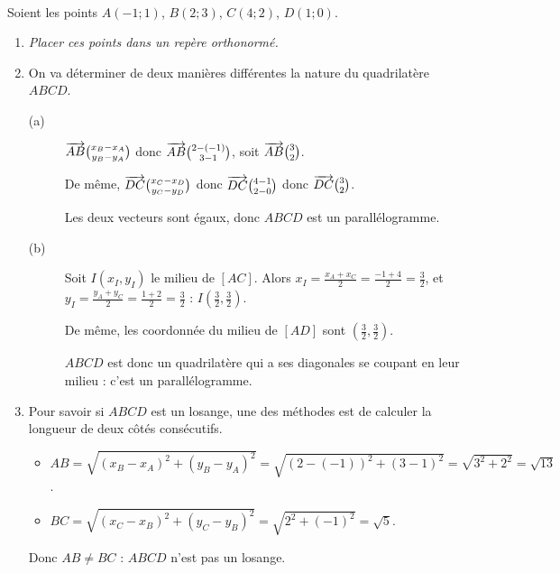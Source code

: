 \documentclass[11pt]{article}
\begin{document}
\begin{exercice}[Repérage]~

  Soient les points $A(-1;1)$, $B(2;3)$, $C(4;2)$, $D(1;0)$.
  \begin{enumerate}
    \item \emph{Placer ces points dans un repère orthonormé.}

    \item On va déterminer de deux manières différentes la nature du quadrilatère $ABCD$.
      \begin{description}
        \item[(a)] $\overrightarrow{AB}\binom{x_B-x_A}{y_B-y_A}$ donc
          $\overrightarrow{AB}\binom{2-(-1)}{3-1}$, soit 
          $\overrightarrow{AB}\binom{3}{2}$.
                   
                   De même, $\overrightarrow{DC}\binom{x_C-x_D}{y_C-y_D}$ donc
                   $\overrightarrow{DC}\binom{4-1}{2-0}$ donc
                   $\overrightarrow{DC}\binom{3}{2}$.

                   Les deux vecteurs sont égaux, donc $ABCD$ est un parallélogramme.
                 \item[(b)] Soit $I({x_I},{y_I})$ le milieu de $[AC]$. Alors 
                   $x_I=\frac{x_A+x_C}{2}=\frac{-1+4}{2}=\frac{3}{2}$,
                   et $y_I=\frac{y_A+y_C}{2}=\frac{ 1+2}{2}=\frac{3}{2}$ : $I(\frac{3}{2},\frac{3}{2})$.

                   De même, les coordonnée du milieu de $[AD]$ sont $({\frac{3}{2}},{\frac{3}{2}})$.

                   $ABCD$ est donc un quadrilatère qui a ses diagonales se coupant en leur milieu : c'est un parallélogramme.
      \end{description}
    \item Pour savoir si $ABCD$ est un losange, une des méthodes est de calculer la longueur de deux côtés consécutifs.
      \begin{itemize}[$\bullet$]
        \item $AB=\sqrt{(x_B-x_A)^2+(y_B-y_A)^2}=\sqrt{(2-(-1))^2+(3-1)^2}=\sqrt{3^2+2^2}=\sqrt{13}$.
        \item $BC=\sqrt{(x_C-x_B)^2+(y_C-y_B)^2}=\sqrt{2^2+(-1)^2}=\sqrt{5}$.
      \end{itemize}
      Donc $AB\neq BC$ : $ABCD$ n'est pas un losange.
  \end{enumerate}
\end{exercice}
\end{document}
